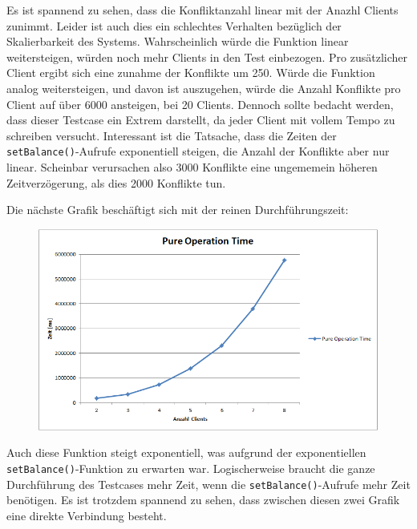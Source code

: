 Es ist spannend zu sehen, dass die Konfliktanzahl linear mit der Anazhl Clients zunimmt. Leider ist auch dies ein schlechtes Verhalten bezüglich der Skalierbarkeit des Systems. Wahrscheinlich würde die Funktion linear weitersteigen, würden noch mehr Clients in den Test einbezogen. \newline
Pro zusätzlicher Client ergibt sich eine zunahme der Konflikte um 250. Würde die Funktion analog weitersteigen, und davon ist auszugehen, würde die Anzahl Konflikte pro Client auf über 6000 ansteigen, bei 20 Clients. Dennoch sollte bedacht werden, dass dieser Testcase ein Extrem darstellt, da jeder Client mit vollem Tempo zu schreiben versucht. \newline
Interessant ist die Tatsache, dass die Zeiten der \texttt{setBalance()}-Aufrufe exponentiell steigen, die Anzahl der Konflikte aber nur linear. Scheinbar verursachen also 3000 Konflikte eine ungememein höheren Zeitverzögerung, als dies 2000 Konflikte tun. \newline

Die nächste Grafik beschäftigt sich mit der reinen Durchführungszeit:
\begin{figure}[H]
\begin{center}
\includegraphics[scale=0.6]{images_MessErgebnisse/incrementCachePureOperationTime.png}
\end{center}
\end{figure}

Auch diese Funktion steigt exponentiell, was aufgrund der exponentiellen \texttt{setBalance()}-Funktion zu erwarten war. Logischerweise braucht die ganze Durchführung des Testcases mehr Zeit, wenn die \texttt{setBalance()}-Aufrufe mehr Zeit benötigen. Es ist trotzdem spannend zu sehen, dass zwischen diesen zwei Grafik eine direkte Verbindung besteht.


